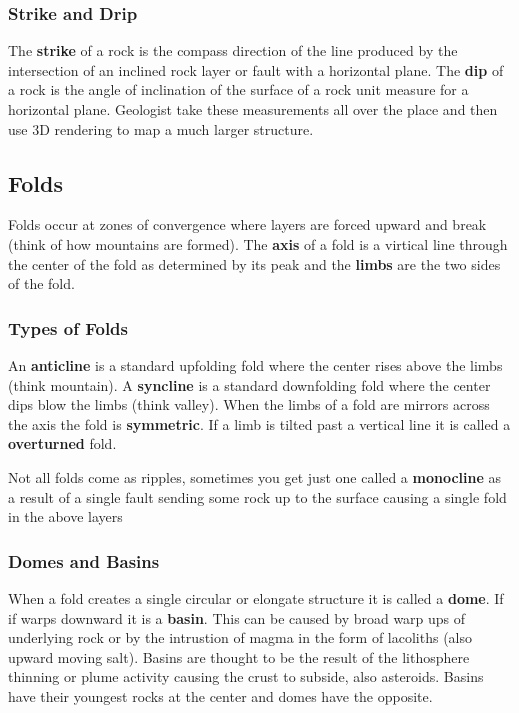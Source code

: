 \documentclass{article}
\begin{document}
\subsubsection{Strike and Drip} %
\label{sub:strike_and_drip}
The \textbf{strike} of a rock is the compass direction of the line produced by the intersection of an inclined rock layer or fault with a horizontal plane. The \textbf{dip} of a rock is the angle of inclination of the surface of a rock unit measure for a horizontal plane. Geologist take these measurements all over the place and then use 3D rendering to map a much larger structure.

\subsection{Folds} %
\label{sub:folds}
Folds occur at zones of convergence where layers are forced upward and break (think of how mountains are formed). The \textbf{axis} of a fold is a virtical line through the center of the fold as determined by its peak and the \textbf{limbs} are the two sides of the fold.

\subsubsection{Types of Folds} %
\label{sub:types_of_folds}
An \textbf{anticline} is a standard upfolding fold where the center rises above the limbs (think mountain). A \textbf{syncline} is a standard downfolding fold where the center dips blow the limbs (think valley). When the limbs of a fold are mirrors across the axis the fold is \textbf{symmetric}. If a limb is tilted past a vertical line it is called a \textbf{overturned} fold.

Not all folds come as ripples, sometimes you get just one called a \textbf{monocline} as a result of a single fault sending some rock up to the surface causing a single fold in the above layers
\subsubsection{Domes and Basins} %
\label{sub:domes_and_basins}
When a fold creates a single circular or elongate structure it is called a \textbf{dome}. If if warps downward it is a \textbf{basin}. This can be caused by broad warp ups of underlying rock or by the intrustion of magma in the form of lacoliths (also upward moving salt). Basins are thought to be the result of the lithosphere thinning or plume activity causing the crust to subside, also asteroids. Basins have their youngest rocks at the center and domes have the opposite.
\end{document}
